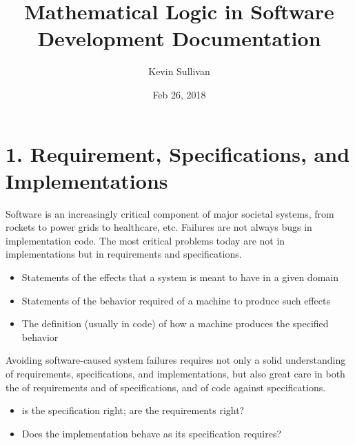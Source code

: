 \documentclass[letterpaper,10pt,english]{sphinxmanual}
\title{Mathematical Logic in Software Development Documentation}
\date{Feb 26, 2018}
\author{Kevin Sullivan}
\begin{document}
\maketitle
\sphinxtableofcontents
{}\label{\detokenize{index::doc}}



\chapter{1. Requirement, Specifications, and Implementations}
\label{\detokenize{01-reqs-specs-impls:welcome-to-mathematical-logic-in-software-development}}\label{\detokenize{01-reqs-specs-impls::doc}}\label{\detokenize{01-reqs-specs-impls:requirement-specifications-and-implementations}}
Software is an increasingly critical component of major societal
systems, from rockets to power grids to healthcare, etc. Failures are
not always bugs in implementation code. The most critical problems
today are not in implementations but in requirements and
specifications.
\begin{itemize}
\item {} 
 Statements of the effects that a system is meant to have in a given domain

\item {} 
 Statements of the behavior required of a machine to produce such effects

\item {} 
 The definition (usually in code) of how a machine produces the specified behavior

\end{itemize}

Avoiding software-caused system failures requires not only a solid
understanding of requirements, specifications, and implementations,
but also great care in both the  of requirements and of
specifications, and  of code against specifications.
\begin{itemize}
\item {} 
  is the specification right; are the requirements right?

\item {} 
  Does the implementation behave as its specification requires?

\end{itemize}
\end{document}
